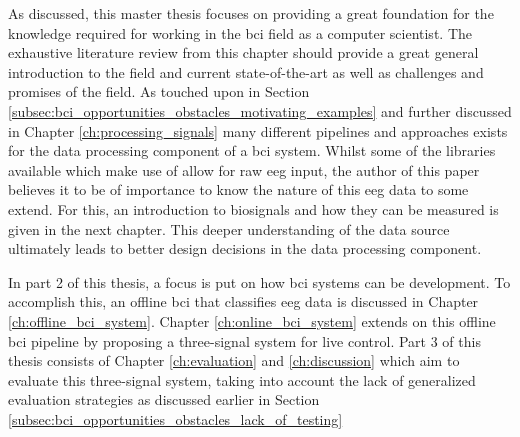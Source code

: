 As discussed, this master thesis focuses on providing a great foundation for the knowledge required for working in the \gls{bci} field as a computer scientist.
The exhaustive literature review from this chapter should provide a great general introduction to the field and current state-of-the-art as well as challenges and promises of the field.
As touched upon in Section \ref{subsec:bci_opportunities_obstacles_motivating_examples} and further discussed in Chapter \ref{ch:processing_signals} many different pipelines and approaches exists for the data processing component of a \gls{bci} system.
Whilst some of the libraries available which make use of  allow for raw \gls{eeg} input, the author of this paper believes it to be of importance to know the nature of this \gls{eeg} data to some extend.
For this, an introduction to \glspl{biosignal} and how they can be measured is given in the next chapter.
This deeper understanding of the data source ultimately leads to better design decisions in the data processing component.

In part 2 of this thesis, a focus is put on how \gls{bci} systems can be development.
To accomplish this, an offline \gls{bci} that classifies \gls{eeg} data is discussed in Chapter \ref{ch:offline_bci_system}.
Chapter \ref{ch:online_bci_system} extends on this offline \gls{bci} pipeline by proposing a three-signal system for live control.
Part 3 of this thesis consists of Chapter \ref{ch:evaluation} and \ref{ch:discussion} which aim to evaluate this three-signal system, taking into account the lack of generalized evaluation strategies as discussed earlier in Section \ref{subsec:bci_opportunities_obstacles_lack_of_testing}